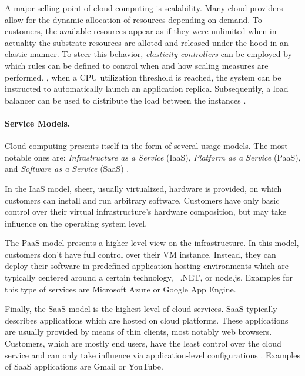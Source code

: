 A major selling point of cloud computing is scalability. Many cloud providers allow for the dynamic allocation of resources depending on demand. To customers, the available resources appear as if they were unlimited when in actuality the substrate resources are alloted and released under the hood in an elastic manner. To steer this behavior, \emph{elasticity controllers} can be employed by which rules can be defined to control when and how scaling measures are performed. \Eg , when a CPU utilization threshold is reached, the system can be instructed to automatically launch an application replica. Subsequently, a load balancer can be used to distribute the load between the instances \cite{vaquero2011dynamically}.


\paragraph{Service Models.}
Cloud computing presents itself in the form of several usage models. The most notable ones are: \emph{Infrastructure as a Service} (IaaS),  \emph{Platform as a Service} (PaaS),  and \emph{Software as a Service} (SaaS) \cite{mell2011nist}.

In the IaaS model, sheer, usually virtualized, hardware is provided, on which customers can install and run arbitrary software. Customers have only basic control over their virtual infrastructure's hardware composition, but may take influence on the operating system level.

The PaaS model presents a higher level view on the infrastructure. In this model, customers don't have full control over their VM instance. Instead, they can deploy their software in predefined application-hosting environments \cite{mell2011nist} which are typically centered around a certain technology, \eg\ .NET, or node.js. Examples for this type of services are Microsoft Azure or Google App Engine.

Finally, the SaaS model is the highest level of cloud services. SaaS typically describes applications which are hosted on cloud platforms. These applications are usually provided by means of thin clients, most notably web browsers. Customers, which are mostly end users, have the least control over the cloud service and can only take influence via application-level configurations \cite{mell2011nist}. Examples of SaaS applications are Gmail or YouTube.








